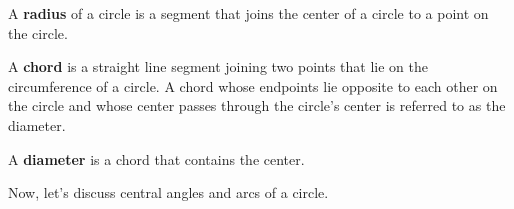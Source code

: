 \begin{figure}[htpb]
  \centering


  \label{fig:circle_with_radius_chord_and_diameter}
\end{figure}

\begin{definition}[Radius]
  \label{def:radius}

  A \textbf{radius} of a circle is a segment that joins the center of a circle
  to a point on the circle.
\end{definition}

\begin{definition}[Chord]
  \label{def:chord}

  A \textbf{chord} is a straight line segment joining two points that lie on
  the circumference of a circle. A chord whose endpoints lie opposite to each
  other on the circle and whose center passes through the circle's center is
  referred to as the diameter.
\end{definition}

\begin{definition}[Diameter]
  \label{def:diameter}

  A \textbf{diameter} is a chord that contains the center.
\end{definition}

Now, let's discuss central angles and arcs of a circle.

\begin{figure}[htpb]
  \centering


  \label{fig:angles_and_arcs_of_a_circle}
\end{figure}


